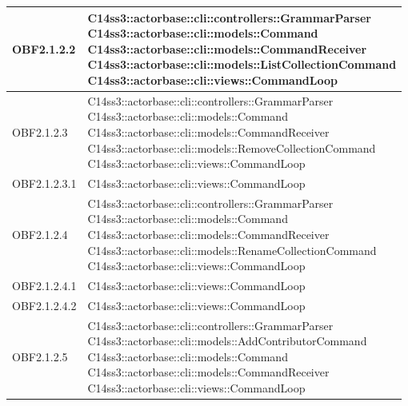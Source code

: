 \documentclass{scalatekids-article}
\begin{document}
\begin{longtable}[H]{|p{4.5cm}|p{13cm}|}
\hline
OBF2.1.2.2 & \multiLineCell[t]{C14ss3::actorbase::cli::controllers::GrammarParser\\C14ss3::actorbase::cli::models::Command\\C14ss3::actorbase::cli::models::CommandReceiver\\C14ss3::actorbase::cli::models::ListCollectionCommand\\C14ss3::actorbase::cli::views::CommandLoop\\}\\
\hline
OBF2.1.2.3 & \multiLineCell[t]{C14ss3::actorbase::cli::controllers::GrammarParser\\C14ss3::actorbase::cli::models::Command\\C14ss3::actorbase::cli::models::CommandReceiver\\C14ss3::actorbase::cli::models::RemoveCollectionCommand\\C14ss3::actorbase::cli::views::CommandLoop\\}\\
\hline
OBF2.1.2.3.1 & \multiLineCell[t]{C14ss3::actorbase::cli::views::CommandLoop\\}\\
\hline
OBF2.1.2.4 & \multiLineCell[t]{C14ss3::actorbase::cli::controllers::GrammarParser\\C14ss3::actorbase::cli::models::Command\\C14ss3::actorbase::cli::models::CommandReceiver\\C14ss3::actorbase::cli::models::RenameCollectionCommand\\C14ss3::actorbase::cli::views::CommandLoop\\}\\
\hline
OBF2.1.2.4.1 & \multiLineCell[t]{C14ss3::actorbase::cli::views::CommandLoop\\}\\
\hline
OBF2.1.2.4.2 & \multiLineCell[t]{C14ss3::actorbase::cli::views::CommandLoop\\}\\
\hline
OBF2.1.2.5 & \multiLineCell[t]{C14ss3::actorbase::cli::controllers::GrammarParser\\C14ss3::actorbase::cli::models::AddContributorCommand\\C14ss3::actorbase::cli::models::Command\\C14ss3::actorbase::cli::models::CommandReceiver\\C14ss3::actorbase::cli::views::CommandLoop\\}\\

\end{longtable}
\end{document}
